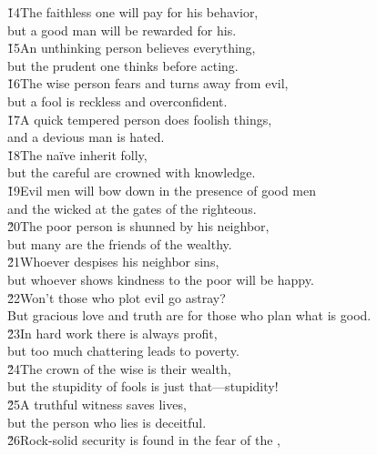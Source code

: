 \begin{poetry}
\poeml \v{14}The faithless one will pay for his behavior, \\
\poemll    but a good man will be rewarded for his. \\
\poeml \v{15}An unthinking person believes everything, \\
\poemll    but the prudent one thinks before acting. \\
\poeml \v{16}The wise person fears and turns away from evil, \\
\poemll    but a fool is reckless and overconfident. \\
\poeml \v{17}A quick tempered person does foolish things, \\
\poemll    and a devious man is hated. \\
\poeml \v{18}The na\"{i}ve inherit folly, \\
\poemll    but the careful are crowned with knowledge. \\
\poeml \v{19}Evil men will bow down in the presence of good men \\
\poemll    and the wicked at the gates of the righteous. \\
\poeml \v{20}The poor person is shunned by his neighbor, \\
\poemll    but many are the friends of the wealthy. \\
\poeml \v{21}Whoever despises his neighbor sins, \\
\poemll    but whoever shows kindness to the poor will be happy. \\
\poeml \v{22}Won't those who plot evil go astray? \\
\poemll    But gracious love and truth are for those who plan what is good. \\
\poeml \v{23}In hard work there is always profit, \\
\poemll    but too much chattering leads to poverty. \\
\poeml \v{24}The crown of the wise is their wealth, \\
\poemll    but the stupidity of fools is just that---stupidity! \\
\poeml \v{25}A truthful witness saves lives, \\
\poemll    but the person who lies is deceitful. \\
\poeml \v{26}Rock-solid security is found in the fear of the , \\

\end{poetry}
